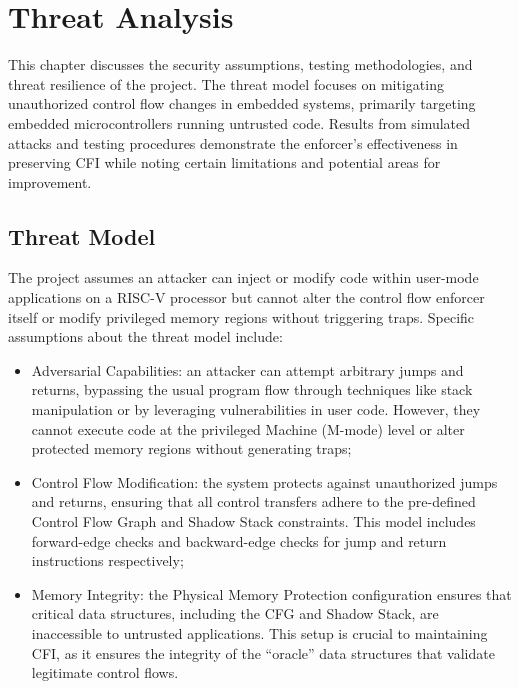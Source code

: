 \chapter{Threat Analysis}
\label{cha:ta}

This chapter discusses the security assumptions, testing methodologies, and
threat resilience of the project. The threat model focuses on mitigating unauthorized
control flow changes in embedded systems, primarily targeting embedded
microcontrollers running untrusted code. Results from simulated attacks and testing
procedures demonstrate the enforcer's effectiveness in preserving CFI while noting
certain limitations and potential areas for improvement.

\section{Threat Model}
\label{sec:ta_model}

The project assumes an attacker can inject or modify code within user-mode
applications on a RISC-V processor but cannot alter the control flow enforcer
itself or modify privileged memory regions without triggering traps. Specific assumptions
about the threat model include:

\begin{itemize}
  \item Adversarial Capabilities: an attacker can attempt arbitrary jumps and
    returns, bypassing the usual program flow through techniques like stack manipulation
    or by leveraging vulnerabilities in user code. However, they cannot execute code
    at the privileged Machine (M-mode) level or alter protected memory regions without
    generating traps;

  \item Control Flow Modification: the system protects against unauthorized
    jumps and returns, ensuring that all control transfers adhere to the pre-defined
    Control Flow Graph and Shadow Stack constraints. This model includes forward-edge
    checks and backward-edge checks for jump and return instructions
    respectively;

  \item Memory Integrity: the Physical Memory Protection configuration ensures
    that critical data structures, including the CFG and Shadow Stack, are
    inaccessible to untrusted applications. This setup is crucial to maintaining
    CFI, as it ensures the integrity of the ``oracle'' data structures that
    validate legitimate control flows.
\end{itemize}

